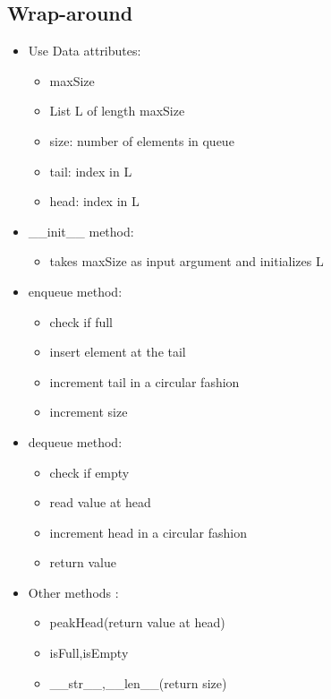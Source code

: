 \documentclass[12pt,oneside]{book}
\begin{document}
\subsection{Wrap-around}
\begin{minipage}{0.5\linewidth}
	\begin{itemize}
		\item Use Data attributes:
		      \begin{itemize}
			      \item maxSize
			      \item List L of length maxSize
			      \item size: number of elements in queue
			      \item tail: index in L
			      \item head: index in L
		      \end{itemize}
		\item \_\_init\_\_ method:
		      \begin{itemize}
			      \item takes maxSize as input argument and initializes L
		      \end{itemize}
		\item enqueue method:
		      \begin{itemize}
			      \item check if full
			      \item insert element at the tail
			      \item increment tail in a circular fashion
			      \item increment size
		      \end{itemize}
		\item dequeue method:
		      \begin{itemize}
			      \item check if empty
			      \item read value at head
			      \item increment head in a circular fashion
			      \item return value
		      \end{itemize}
		\item Other methods :
		      \begin{itemize}
			      \item peakHead(return value at head)
			      \item isFull,isEmpty
			      \item \_\_str\_\_,\_\_len\_\_(return size)
		      \end{itemize}
	\end{itemize}

\end{minipage}
\end{document}
